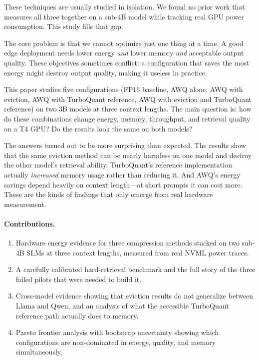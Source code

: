 \documentclass[sigconf,nonacm]{acmart}
\begin{document}
These techniques are usually studied in isolation. We found no prior work that
measures all three together on a sub-4B model while tracking real GPU power
consumption. This study fills that gap.

The core problem is that we cannot optimize just one thing at a time. A good edge
deployment needs lower energy \emph{and} lower memory \emph{and} acceptable
output quality. These objectives sometimes conflict: a configuration that saves
the most energy might destroy output quality, making it useless in practice.

This paper studies five configurations (FP16 baseline, AWQ alone, AWQ with
eviction, AWQ with TurboQuant reference, AWQ with eviction and TurboQuant
reference) on two 3B models at three context lengths. The main question is: how
do these combinations change energy, memory, throughput, and retrieval quality on
a T4 GPU? Do the results look the same on both models?

The answers turned out to be more surprising than expected. The results show that
the same eviction method can be nearly harmless on one model and destroy the other
model's retrieval ability. TurboQuant's reference implementation actually
\emph{increased} memory usage rather than reducing it. And AWQ's energy savings
depend heavily on context length---at short prompts it can cost more. These are
the kinds of findings that only emerge from real hardware measurement.

\paragraph{Contributions.}
\begin{enumerate}
  \item Hardware energy evidence for three compression methods stacked on two
    sub-4B SLMs at three context lengths, measured from real NVML power traces.
  \item A carefully calibrated hard-retrieval benchmark and the full story of
    the three failed pilots that were needed to build it.
  \item Cross-model evidence showing that eviction results do not generalize
    between Llama and Qwen, and an analysis of what the accessible TurboQuant
    reference path actually does to memory.
  \item Pareto frontier analysis with bootstrap uncertainty showing which
    configurations are non-dominated in energy, quality, and memory simultaneously.
\end{enumerate}
\end{document}
